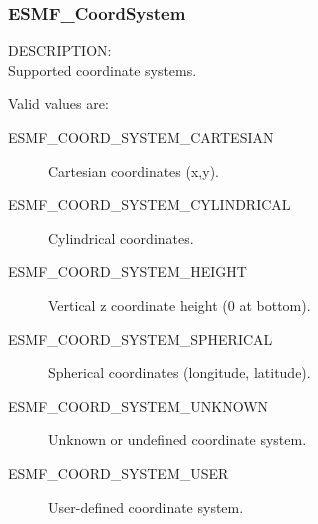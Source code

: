  \subsubsection{ESMF\_CoordSystem}

 {\sf DESCRIPTION:\\}
 Supported coordinate systems.

 Valid values are:
 \begin{description}
    \item [ESMF\_COORD\_SYSTEM\_CARTESIAN]
          Cartesian coordinates (x,y).

    \item [ESMF\_COORD\_SYSTEM\_CYLINDRICAL] 
          Cylindrical coordinates.

    \item [ESMF\_COORD\_SYSTEM\_HEIGHT]
          Vertical z coordinate height (0 at bottom).

    \item [ESMF\_COORD\_SYSTEM\_SPHERICAL]
          Spherical coordinates (longitude, latitude).

    \item [ESMF\_COORD\_SYSTEM\_UNKNOWN]
          Unknown or undefined coordinate system.
    \item [ESMF\_COORD\_SYSTEM\_USER]
          User-defined coordinate system.

 \end{description}


